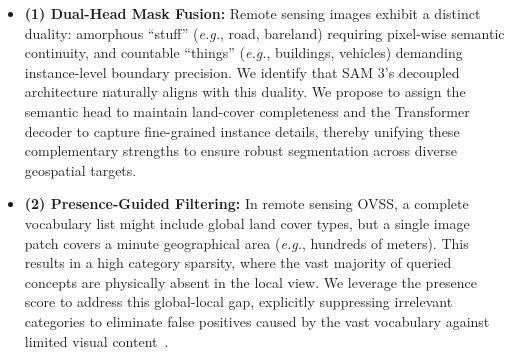 \documentclass[twocolumn,switch,times]{article}
\begin{document}
\begin{itemize}
    \item \textbf{(1) Dual-Head Mask Fusion:} Remote sensing images exhibit a distinct duality: amorphous ``stuff'' (\textit{e.g.}, road, bareland) requiring pixel-wise semantic continuity, and countable ``things'' (\textit{e.g.}, buildings, vehicles) demanding instance-level boundary precision. We identify that SAM 3's decoupled architecture naturally aligns with this duality. We propose to assign the semantic head to maintain land-cover completeness and the Transformer decoder to capture fine-grained instance details, thereby unifying these complementary strengths to ensure robust segmentation across diverse geospatial targets.
    \item \textbf{(2) Presence-Guided Filtering:} In remote sensing OVSS, a complete vocabulary list might include global land cover types, but a single image patch covers a minute geographical area (\textit{e.g.}, hundreds of meters). This results in a high category sparsity, where the vast majority of queried concepts are physically absent in the local view. We leverage the presence score to address this global-local gap, explicitly suppressing irrelevant categories to eliminate false positives caused by the vast vocabulary against limited visual content~\citep{sun2024clip, chen2025training}.
\end{itemize}
\end{document}
